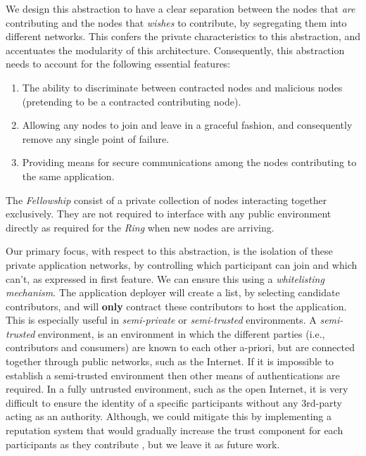 \documentclass[12pt, titlepage]{uo_temp}
\begin{document}
     We design this abstraction to have a clear separation between the nodes that
     \emph{are} contributing and the nodes that \emph{wishes} to contribute, by
     segregating them into different networks. This confers the private characteristics to
     this abstraction, and accentuates the modularity of this architecture. Consequently,
     this abstraction needs to account for the following essential features:

     \begin{enumerate}
       \item The ability to discriminate between contracted nodes and malicious nodes
         (pretending to be a contracted contributing node).
       \item Allowing any nodes to join and leave in a graceful fashion, and consequently
         remove any single point of failure.
       \item Providing means for secure communications among the nodes contributing to the
         same application. 
     \end{enumerate}

     The \emph{Fellowship} consist of a private collection of nodes interacting together
     exclusively. They are not required to interface with any public environment directly
     as required for the \emph{Ring} when new nodes are arriving.

     Our primary focus, with respect to this abstraction, is the isolation of these
     private application networks, by controlling which participant can join and which
     can't, as expressed in first feature. We can ensure this using a \emph{whitelisting
       mechanism}. The application deployer will create a list, by selecting candidate
     contributors, and will \textbf{only} contract these contributors to host the
     application. This is especially useful in \emph{semi-private} or \emph{semi-trusted}
     environments. A \emph{semi-trusted} environment, is an environment in which the
     different parties (i.e., contributors and consumers) are known to each other
     a-priori, but are connected together through public networks, such as the
     Internet. If it is impossible to establish a semi-trusted environment then other
     means of authentications are required. In a fully untrusted environment, such as the
     open Internet, it is very difficult to ensure the identity of a specific participants
     without any 3rd-party acting as an authority. Although, we could mitigate this by
     implementing a reputation system that would gradually increase the trust component
     for each participants as they contribute \cite{jin2010unstructured}, but we leave it as
     future work.
     
\end{document}
